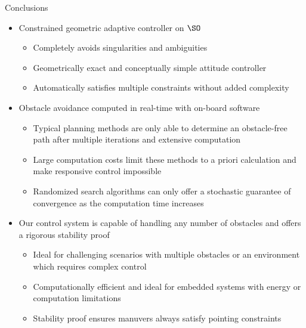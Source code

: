 \documentclass[final, usenames, dvipsnames]{beamer}
\newlength{\onecolwidth}
\begin{document}
\begin{frame}[t]
\begin{columns}[T,onlytextwidth]
\begin{column}{\onecolwidth}
\begin{block}{Conclusions} %
	\begin{itemize}
		\item Constrained geometric adaptive controller on \( \SO \)
		\begin{itemize}
			\item Completely avoids singularities and ambiguities 
			\item Geometrically exact and conceptually simple attitude controller
			\item Automatically satisfies multiple constraints without added complexity
		\end{itemize}
		\item Obstacle avoidance computed in real-time with on-board software
		\begin{itemize}
			\item Typical planning methods are only able to determine an obstacle-free path after multiple iterations and extensive computation
			\item Large computation costs limit these methods to a priori calculation and make responsive control impossible
			\item Randomized search algorithms can only offer a stochastic guarantee of convergence as the computation time increases
		\end{itemize}
		\item Our control system is capable of handling any number of obstacles and offers a rigorous stability proof
		\begin{itemize}
			\item Ideal for challenging scenarios with multiple obstacles or an environment which requires complex control
			\item Computationally efficient and ideal for embedded systems with energy or computation limitations
			\item Stability proof ensures manuvers always satisfy pointing constraints 
		\end{itemize}
	\end{itemize}
\end{block} %
\end{column}  %

\end{columns} %
\end{frame} %
\end{document}
